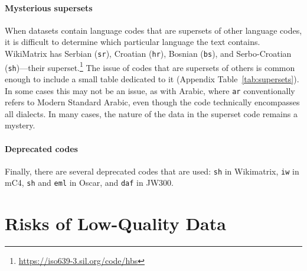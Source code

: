 \paragraph{Mysterious supersets}
When datasets contain language codes that are supersets of other language codes, it is difficult to determine which particular language the text contains. WikiMatrix has Serbian (\texttt{sr}), Croatian (\texttt{hr}), Bosnian (\texttt{bs}), and Serbo-Croatian (\texttt{sh})---their superset.\footnote{\url{https://iso639-3.sil.org/code/hbs}}
The issue of codes that are supersets of others is common enough to include a small table dedicated to it (Appendix Table~\ref{tab:supersets}).
In some cases this may not be an issue, as with Arabic, where \texttt{ar} conventionally refers to Modern Standard Arabic, even though the code technically encompasses all dialects.
In many cases, the nature of the data in the superset code remains a mystery.


\paragraph{Deprecated codes} Finally, there are several deprecated codes that are used: \texttt{sh} in Wikimatrix, \texttt{iw} in mC4, \texttt{sh} and \texttt{eml} in Oscar, and \texttt{daf} in JW300.

\section{Risks of Low-Quality Data}\label{sec:risk}

